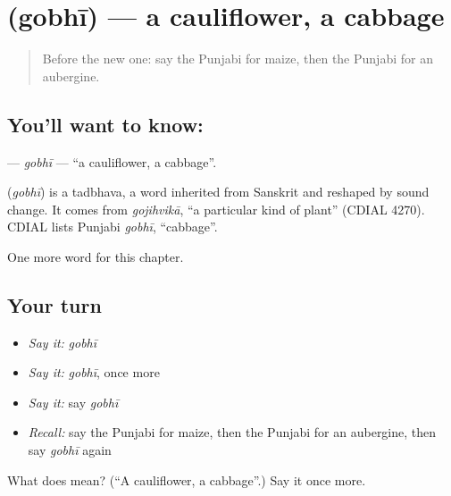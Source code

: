 \section[\texorpdfstring{\pa{ਗੋਭੀ} (gobhī)}{ਗੋਭੀ (gobhī)}]{ (gobhī) — a cauliflower, a cabbage}

\label{lesson:PA-C122-gobhi}



\begin{quote}
Before the new one: say the Punjabi for maize, then the Punjabi for an aubergine.
\end{quote}

\subsection*{You'll want to know: }
\textbf{} — \emph{gobhī} — \textquotedblleft{}a cauliflower, a cabbage\textquotedblright{}.

\begin{cousinweb}
\textbf{} (\emph{gobhī}) is a tadbhava, a word inherited from Sanskrit and reshaped by sound change. It comes from \emph{gojihvikā}, \textquotedblleft{}a particular kind of plant\textquotedblright{} (CDIAL 4270). CDIAL lists Punjabi \emph{gobhī}, \textquotedblleft{}cabbage\textquotedblright{}.
\end{cousinweb}

\begin{grammarlens}[title={What you've built}]
One more word for this chapter.
\end{grammarlens}

\subsection*{Your turn}
\begin{itemize}
\raggedright
  \item \emph{Say it:} \emph{gobhī}
  \item \emph{Say it:} \emph{gobhī}, once more
  \item \emph{Say it:} say \emph{gobhī}
  \item \emph{Recall:} say the Punjabi for maize, then the Punjabi for an aubergine, then say \emph{gobhī} again
\end{itemize}

\begin{tcolorbox}[breakable,colback=teal!4,colframe=teal!35!black,title={Before you move on}]
What does  mean? (\textquotedblleft{}A cauliflower, a cabbage\textquotedblright{}.) Say it once more.
\end{tcolorbox}
